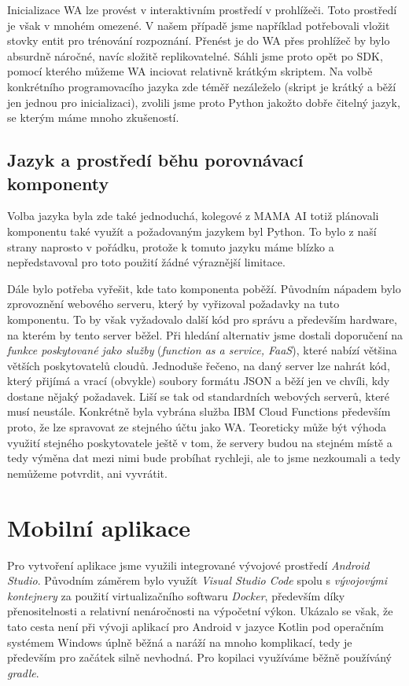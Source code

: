 Inicializace WA lze provést v interaktivním prostředí v prohlížeči. Toto
prostředí je však v mnohém omezené. V našem případě jsme například potřebovali
vložit stovky entit pro trénování rozpoznání. Přenést je do WA přes prohlížeč
by bylo absurdně náročné, navíc složitě replikovatelné. Sáhli jsme proto opět
po SDK, pomocí kterého můžeme WA inciovat relativně krátkým skriptem. Na volbě
konkrétního programovacího jazyka zde téměř nezáleželo (skript je krátký a běží
jen jednou pro inicializaci), zvolili jsme proto Python jakožto dobře čitelný
jazyk, se kterým máme mnoho zkušeností.

\subsection{Jazyk a prostředí běhu porovnávací komponenty}

Volba jazyka byla zde také jednoduchá, kolegové z MAMA AI totiž plánovali
komponentu také využít a požadovaným jazykem byl Python. To bylo z naší
strany naprosto v pořádku, protože k tomuto jazyku máme blízko a nepředstavoval
pro toto použití žádné výraznější limitace.

Dále bylo potřeba vyřešit, kde tato komponenta poběží. Původním nápadem bylo
zprovoznění webového serveru, který by vyřizoval požadavky na tuto komponentu.
To by však vyžadovalo další kód pro správu a především hardware, na kterém by
tento server běžel. Při hledání alternativ jsme dostali doporučení na
\textit{funkce poskytované jako služby} (\textit{function as a service, FaaS}),
které nabízí většina větších poskytovatelů cloudů. Jednoduše řečeno, na daný
server lze nahrát kód, který přijímá a vrací (obvykle) soubory formátu JSON a
běží jen ve chvíli, kdy dostane nějaký požadavek. Liší se tak od standardních
webových serverů, které musí  neustále. Konkrétně byla vybrána
služba IBM Cloud Functions především proto, že lze spravovat ze stejného účtu jako
WA. Teoreticky může být výhoda využití stejného poskytovatele ještě v tom, že
servery budou na stejném místě a tedy výměna dat mezi nimi bude probíhat rychleji,
ale to jsme nezkoumali a tedy nemůžeme potvrdit, ani vyvrátit.

\section{Mobilní aplikace}

Pro vytvoření aplikace jsme využili integrované vývojové prostředí
\textit{Android Studio}. Původním záměrem bylo využít \textit{Visual Studio Code}
spolu s \textit{vývojovými kontejnery} za použití virtualizačního softwaru
\textit{Docker}, především díky přenositelnosti a relativní nenáročnosti
na výpočetní výkon. Ukázalo se však, že tato cesta není při vývoji aplikací
pro Android v jazyce Kotlin pod operačním systémem Windows úplně běžná a
naráží na mnoho komplikací, tedy je především pro začátek silně nevhodná.
Pro kopilaci využíváme běžně používáný \textit{gradle}.

